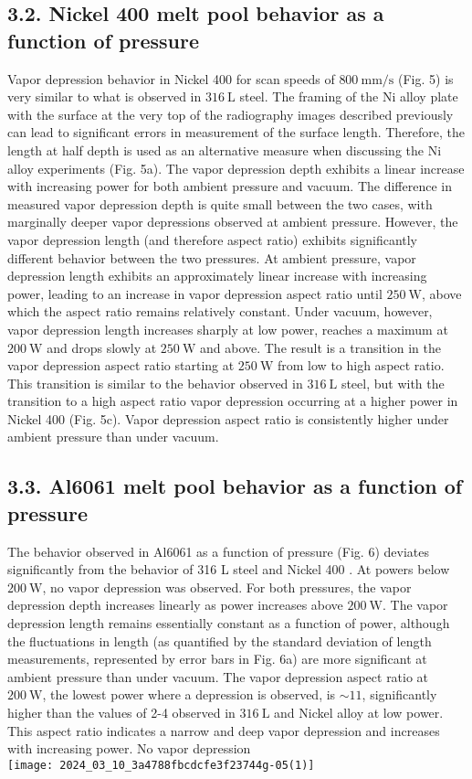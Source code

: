 \documentclass[10pt]{article}
\begin{document}
\subsection*{3.2. Nickel 400 melt pool behavior as a function of pressure}
Vapor depression behavior in Nickel 400 for scan speeds of $800 \mathrm{~mm} / \mathrm{s}$ (Fig. 5) is very similar to what is observed in $316 \mathrm{~L}$ steel. The framing of the Ni alloy plate with the surface at the very top of the radiography images described previously can lead to significant errors in measurement of the surface length. Therefore, the length at half depth is used as an alternative measure when discussing the Ni alloy experiments (Fig. 5a). The vapor depression depth exhibits a linear increase with increasing power for both ambient pressure and vacuum. The difference in measured vapor depression depth is quite small between the two cases, with marginally deeper vapor depressions observed at ambient pressure. However, the vapor depression length (and therefore aspect ratio) exhibits significantly different behavior between the two pressures. At ambient pressure, vapor depression length exhibits an approximately linear increase with increasing power, leading to an increase in vapor depression aspect ratio until $250 \mathrm{~W}$, above which the aspect ratio remains relatively constant. Under vacuum, however, vapor depression length increases sharply at low power, reaches a maximum at $200 \mathrm{~W}$ and drops slowly at $250 \mathrm{~W}$ and above. The result is a transition in the vapor depression aspect ratio starting at $250 \mathrm{~W}$ from low to high aspect ratio. This transition is similar to the behavior observed in $316 \mathrm{~L}$ steel, but with the transition to a high aspect ratio vapor depression occurring at a higher power in Nickel 400 (Fig. 5c). Vapor depression aspect ratio is consistently higher under ambient pressure than under vacuum.

\subsection*{3.3. Al6061 melt pool behavior as a function of pressure}
The behavior observed in Al6061 as a function of pressure (Fig. 6) deviates significantly from the behavior of 316 L steel and Nickel 400 . At powers below $200 \mathrm{~W}$, no vapor depression was observed. For both pressures, the vapor depression depth increases linearly as power increases above $200 \mathrm{~W}$. The vapor depression length remains essentially constant as a function of power, although the fluctuations in length (as quantified by the standard deviation of length measurements, represented by error bars in Fig. 6a) are more significant at ambient pressure than under vacuum. The vapor depression aspect ratio at $200 \mathrm{~W}$, the lowest power where a depression is observed, is $\sim 11$, significantly higher than the values of 2-4 observed in $316 \mathrm{~L}$ and Nickel alloy at low power. This aspect ratio indicates a narrow and deep vapor depression and increases with increasing power. No vapor depression\\
\texttt{[image: 2024\_03\_10\_3a4788fbcdcfe3f23744g-05(1)]}
\end{document}
